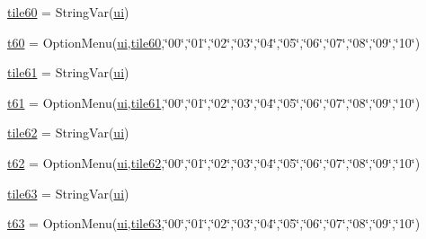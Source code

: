 \begin{DoxyCompactItemize}
\item 
\mbox{\hyperlink{namespacegui_ab03da7520cb8fba94a7355a29961a27c}{tile60}} = String\+Var(\mbox{\hyperlink{namespacegui_a40ab7281456eadbea2dc2038f5c24fa1}{ui}})
\item 
\mbox{\hyperlink{namespacegui_a3cd5c6177361d8c96b000f4b6f2f7ce4}{t60}} = Option\+Menu(\mbox{\hyperlink{namespacegui_a40ab7281456eadbea2dc2038f5c24fa1}{ui}},\mbox{\hyperlink{namespacegui_ab03da7520cb8fba94a7355a29961a27c}{tile60}},\char`\"{}00\char`\"{},\char`\"{}01\char`\"{},\char`\"{}02\char`\"{},\char`\"{}03\char`\"{},\char`\"{}04\char`\"{},\char`\"{}05\char`\"{},\char`\"{}06\char`\"{},\char`\"{}07\char`\"{},\char`\"{}08\char`\"{},\char`\"{}09\char`\"{},\char`\"{}10\char`\"{})
\item 
\mbox{\hyperlink{namespacegui_a72aee8d939c765161a5aae9a00f1eaa9}{tile61}} = String\+Var(\mbox{\hyperlink{namespacegui_a40ab7281456eadbea2dc2038f5c24fa1}{ui}})
\item 
\mbox{\hyperlink{namespacegui_ae908e57760921433263e34773bc540d7}{t61}} = Option\+Menu(\mbox{\hyperlink{namespacegui_a40ab7281456eadbea2dc2038f5c24fa1}{ui}},\mbox{\hyperlink{namespacegui_a72aee8d939c765161a5aae9a00f1eaa9}{tile61}},\char`\"{}00\char`\"{},\char`\"{}01\char`\"{},\char`\"{}02\char`\"{},\char`\"{}03\char`\"{},\char`\"{}04\char`\"{},\char`\"{}05\char`\"{},\char`\"{}06\char`\"{},\char`\"{}07\char`\"{},\char`\"{}08\char`\"{},\char`\"{}09\char`\"{},\char`\"{}10\char`\"{})
\item 
\mbox{\hyperlink{namespacegui_a13b3be2d7f981617df137af52770951f}{tile62}} = String\+Var(\mbox{\hyperlink{namespacegui_a40ab7281456eadbea2dc2038f5c24fa1}{ui}})
\item 
\mbox{\hyperlink{namespacegui_acc0870790aeda4948db20409ee4f73c1}{t62}} = Option\+Menu(\mbox{\hyperlink{namespacegui_a40ab7281456eadbea2dc2038f5c24fa1}{ui}},\mbox{\hyperlink{namespacegui_a13b3be2d7f981617df137af52770951f}{tile62}},\char`\"{}00\char`\"{},\char`\"{}01\char`\"{},\char`\"{}02\char`\"{},\char`\"{}03\char`\"{},\char`\"{}04\char`\"{},\char`\"{}05\char`\"{},\char`\"{}06\char`\"{},\char`\"{}07\char`\"{},\char`\"{}08\char`\"{},\char`\"{}09\char`\"{},\char`\"{}10\char`\"{})
\item 
\mbox{\hyperlink{namespacegui_ad42c2e1d85c862f7218f07791aad0d8a}{tile63}} = String\+Var(\mbox{\hyperlink{namespacegui_a40ab7281456eadbea2dc2038f5c24fa1}{ui}})
\item 
\mbox{\hyperlink{namespacegui_a1aa84116c728e10eee4388bb757714c3}{t63}} = Option\+Menu(\mbox{\hyperlink{namespacegui_a40ab7281456eadbea2dc2038f5c24fa1}{ui}},\mbox{\hyperlink{namespacegui_ad42c2e1d85c862f7218f07791aad0d8a}{tile63}},\char`\"{}00\char`\"{},\char`\"{}01\char`\"{},\char`\"{}02\char`\"{},\char`\"{}03\char`\"{},\char`\"{}04\char`\"{},\char`\"{}05\char`\"{},\char`\"{}06\char`\"{},\char`\"{}07\char`\"{},\char`\"{}08\char`\"{},\char`\"{}09\char`\"{},\char`\"{}10\char`\"{})

\end{DoxyCompactItemize}
